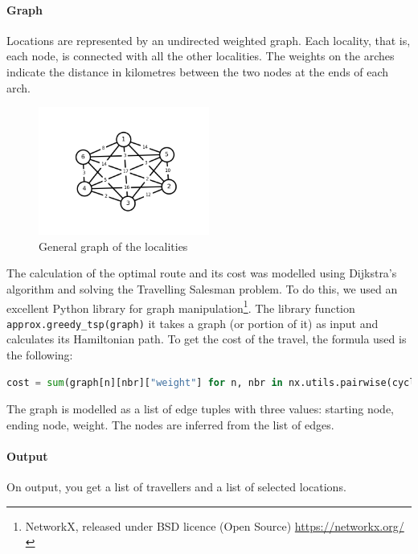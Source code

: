 \documentclass{article}
\begin{document}
\paragraph*{Graph}
Locations are represented by an undirected weighted graph. Each locality, that is, each node, is connected with all the other localities. The weights on the arches indicate the distance in kilometres between the two nodes at the ends of each arch.
\begin{figure}[h]
  \centering
  \includegraphics[width=0.50\textwidth]{img/graphTot.png}
  \caption{General graph of the localities}\label{fig:graphTot.png}
\end{figure}
The calculation of the optimal route and its cost was modelled using Dijkstra's algorithm and solving the Travelling Salesman problem. To do this, we used an excellent Python library for graph manipulation\footnote{NetworkX, released under BSD licence (Open Source) \url{https://networkx.org/}}. The library function \verb|approx.greedy_tsp(graph)| it takes a graph (or portion of it) as input and calculates its Hamiltonian path.
To get the cost of the travel, the formula used is the following:
\begin{lstlisting}[language=Python]
cost = sum(graph[n][nbr]["weight"] for n, nbr in nx.utils.pairwise(cycle))
\end{lstlisting}
The graph is modelled as a list of edge tuples with three values: starting node, ending node, weight.
The nodes are inferred from the list of edges.
\paragraph*{Output}
On output, you get a list of travellers and a list of selected locations.
\end{document}
